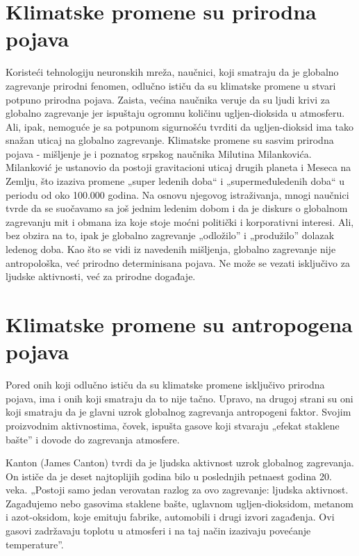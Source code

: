 \documentclass[a4paper]{article}
\begin{document}
\section{Klimatske promene su prirodna pojava}
\label{sec:klimatske_promene_su_prirodna_pojava}
 Koristeći tehnologiju neuronskih mreža, naučnici, koji smatraju da je globalno zagrevanje prirodni fenomen, odlučno ističu da su klimatske promene u stvari potpuno prirodna pojava. Zaista, većina naučnika veruje da su ljudi krivi za globalno zagrevanje jer ispuštaju ogromnu količinu ugljen-dioksida u atmosferu. Ali, ipak, nemoguće je sa potpunom sigurnošću tvrditi da ugljen-dioksid ima tako snažan uticaj na globalno zagrevanje. Klimatske promene su sasvim prirodna pojava - mišljenje je i poznatog srpskog naučnika Milutina Milankovića.
Milanković je ustanovio da postoji gravitacioni uticaj drugih planeta i Meseca na Zemlju, što izaziva promene „super ledenih doba“ i „supermeđuledenih doba“ u periodu od oko 100.000 godina. Na osnovu njegovog istraživanja, mnogi naučnici tvrde da se suočavamo sa još jednim ledenim dobom i da je diskurs o globalnom zagrevanju mit i obmana iza koje stoje moćni politički i korporativni interesi. Ali, bez obzira na to, ipak je globalno zagrevanje „odložilo” i „produžilo” dolazak ledenog doba.
Kao što se vidi iz navedenih mišljenja, globalno zagrevanje nije antropološka, već prirodno determinisana pojava. Ne može se vezati isključivo za ljudske aktivnosti, već za prirodne događaje.

\section{Klimatske promene su antropogena pojava}
\label{sec:klimatske_promene_su_antropogena_pojava}

Pored onih koji odlučno ističu da su klimatske promene isključivo prirodna pojava, ima i onih koji smatraju da to nije tačno. Upravo, na drugoj strani su oni koji smatraju da je glavni uzrok globalnog zagrevanja antropogeni faktor. Svojim proizvodnim aktivnostima, čovek, ispušta gasove koji stvaraju „efekat staklene bašte” i dovode do zagrevanja atmosfere.

Kanton (James Canton) tvrdi da je ljudska aktivnost uzrok globalnog zagrevanja. On ističe da je deset najtoplijih godina bilo u poslednjih petnaest godina 20. veka. „Postoji samo jedan verovatan razlog za ovo zagrevanje: ljudska aktivnost. Zagađujemo nebo gasovima staklene bašte, uglavnom ugljen-dioksidom, metanom i azot-oksidom, koje emituju fabrike, automobili i drugi izvori zagađenja. Ovi gasovi zadržavaju toplotu u atmosferi i na taj način izazivaju povećanje temperature”.
\end{document}
